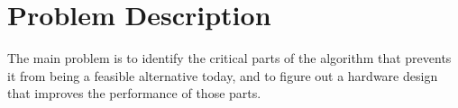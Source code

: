 \chapter{Problem Description}

	The main problem is to identify the critical parts of the algorithm that
	prevents it from being a feasible alternative today, and to figure out a
	 hardware design that improves the performance of those parts.
